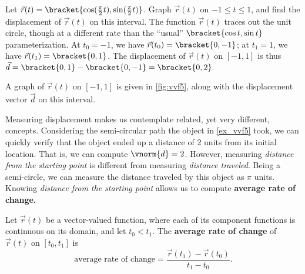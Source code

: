 \begin{example}\label{ex_vvf5}
Let $\vec r(t) =\bracket{\cos (\frac{\pi}{2}t),\sin (\frac{\pi}2 t)}$. Graph $\vec r(t)$ on $-1\leq t\leq 1$, and find the displacement of $\vec r(t)$ on this interval.
\solution
%
%
The function $\vec r(t)$ traces out the unit circle, though at a different rate than the ``usual'' $\bracket{\cos t,\sin t}$ parameterization. At $t_0=-1$, we have $\vec r(t_0) =\bracket{0,-1}$; at $t_1=1$, we have $\vec r(t_1) =\bracket{0,1}$. The displacement of $\vec r(t)$ on $[-1,1]$ is thus $\vec d =\bracket{0,1}-\bracket{0,-1}=\bracket{0,2}.$

A graph of $\vec r(t)$ on $[-1,1]$ is given in \autoref{fig:vvf5}, along with the displacement vector $\vec d$ on this interval.
\end{example}

Measuring displacement makes us contemplate related, yet very different, concepts. Considering the semi-circular path the object in \autoref{ex_vvf5} took, we can quickly verify that the object ended up a distance of 2 units from its initial location. That is, we can compute $\vnorm{d} = 2$. However, measuring \emph{distance from the starting point} is different from measuring \emph{distance traveled}. Being a semi-circle, we can measure the distance traveled by this object as $\pi%
$ units. Knowing \emph{distance from the starting point} allows us to compute \textbf{average rate of change.}

\begin{definition}\label{def:av_rate_of_change_vect}
Let $\vec r(t)$ be a vector-valued function, where each of its component functions is continuous on its domain, and let $t_0<t_1$. The \textbf{average rate of change} of $\vec r(t)$ on $[t_0,t_1]$ is
\[\text{average rate of change} = \frac{\vec r(t_1) - \vec r(t_0)}{t_1-t_0}.\]
\end{definition}

